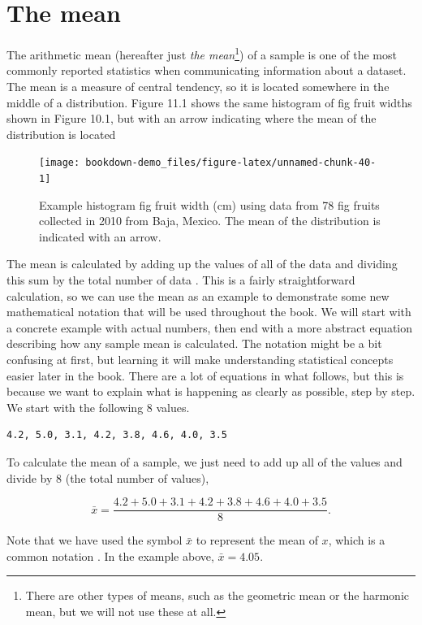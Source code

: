 \documentclass[
]{scrbook}
\begin{document}
\hypertarget{the-mean}{%
\section{The mean}\label{the-mean}}

The arithmetic mean (hereafter just \emph{the mean}\footnote{There are other types of means, such as the geometric mean or the harmonic mean, but we will not use these at all.}) of a sample is one of the most commonly reported statistics when communicating information about a dataset.
The mean is a measure of central tendency, so it is located somewhere in the middle of a distribution.
Figure 11.1 shows the same histogram of fig fruit widths shown in Figure 10.1, but with an arrow indicating where the mean of the distribution is located

\begin{figure}
\texttt{[image: bookdown-demo\_files/figure-latex/unnamed-chunk-40-1]} \caption{Example histogram fig fruit width (cm) using data from 78 fig fruits collected in 2010 from Baja, Mexico. The mean of the distribution is indicated with an arrow.}\label{fig:unnamed-chunk-40}
\end{figure}

The mean is calculated by adding up the values of all of the data and dividing this sum by the total number of data \citep{Sokal1995}.
This is a fairly straightforward calculation, so we can use the mean as an example to demonstrate some new mathematical notation that will be used throughout the book.
We will start with a concrete example with actual numbers, then end with a more abstract equation describing how any sample mean is calculated.
The notation might be a bit confusing at first, but learning it will make understanding statistical concepts easier later in the book.
There are a lot of equations in what follows, but this is because we want to explain what is happening as clearly as possible, step by step.
We start with the following 8 values.

\begin{verbatim}
4.2, 5.0, 3.1, 4.2, 3.8, 4.6, 4.0, 3.5
\end{verbatim}

To calculate the mean of a sample, we just need to add up all of the values and divide by 8 (the total number of values),

\[\bar{x} = \frac{4.2 + 5.0 + 3.1 + 4.2 + 3.8 + 4.6 + 4.0 + 3.5}{8}.\]

Note that we have used the symbol \(\bar{x}\) to represent the mean of \(x\), which is a common notation \citep{Sokal1995}.
In the example above, \(\bar{x} = 4.05\).
\end{document}
